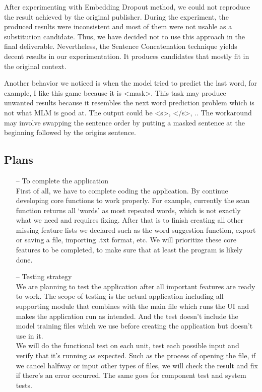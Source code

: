 \documentclass[12pt,oneside,openright,a4paper]{cpe-english-project}
\begin{document}
After experimenting with Embedding Dropout method, we could not reproduce the result achieved by the original publisher. During the experiment, the produced results were inconsistent and most of them were not usable as a substitution candidate. Thus, we have decided not to use this approach in the final deliverable. Nevertheless, the Sentence Concatenation technique yields decent results in our experimentation. It produces candidates that mostly fit in the original context. 

Another behavior we noticed is when the model tried to predict the last word, for example, I like this game because it is <mask>. This task may produce unwanted results because it resembles the next word prediction problem which is not what MLM is good at. The output could be <s>, </s>, .. The workaround may involve swapping the sentence order by putting a masked sentence at the beginning followed by the origins sentence.

\subsection{Plans}
\begin{itemize}
\item[--] To complete the application\\
First of all, we have to complete coding the application. By continue developing core functions to work properly. For example, currently the scan function returns all ‘words’ as most repeated words, which is not exactly what we need and requires fixing. After that is to finish creating all other missing feature lists we declared such as the word suggestion function, export or saving a file, importing .txt format, etc. We will prioritize these core features to be completed, to make sure that at least the program is likely done.
\item[--] Testing strategy\\
We are planning to test the application after all important features are ready to work. The scope of testing is the actual application including all supporting module that combines with the main file which runs the UI and makes the application run as intended. And the test doesn’t include the model training files which we use before creating the application but doesn’t use in it.\\

We will do the functional test on each unit, test each possible input and verify that it’s running as expected. Such as the process of opening the file, if we cancel halfway or input other types of files, we will check the result and fix if there’s an error occurred. The same goes for component test and system tests.

\end{itemize}
\end{document}
